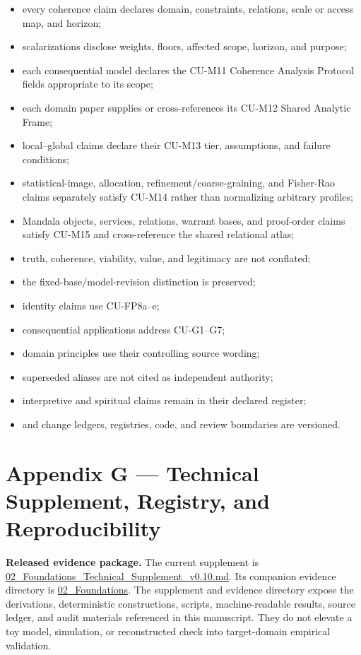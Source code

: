 \documentclass[
  11pt,
]{article}
\providecommand{\tightlist}{%
  \setlength{\itemsep}{0pt}\setlength{\parskip}{0pt}}
\begin{document}
\begin{itemize}
\tightlist
\item
  every coherence claim declares domain, constraints, relations, scale
  or access map, and horizon;
\item
  scalarizations disclose weights, floors, affected scope, horizon, and
  purpose;
\item
  each consequential model declares the CU-M11 Coherence Analysis
  Protocol fields appropriate to its scope;
\item
  each domain paper supplies or cross-references its CU-M12 Shared
  Analytic Frame;
\item
  local--global claims declare their CU-M13 tier, assumptions, and
  failure conditions;
\item
  statistical-image, allocation, refinement/coarse-graining, and
  Fisher-Rao claims separately satisfy CU-M14 rather than normalizing
  arbitrary profiles;
\item
  Mandala objects, services, relations, warrant bases, and proof-order
  claims satisfy CU-M15 and cross-reference the shared relational atlas;
\item
  truth, coherence, viability, value, and legitimacy are not conflated;
\item
  the fixed-base/model-revision distinction is preserved;
\item
  identity claims use CU-FP8a--e;
\item
  consequential applications address CU-G1--G7;
\item
  domain principles use their controlling source wording;
\item
  superseded aliases are not cited as independent authority;
\item
  interpretive and spiritual claims remain in their declared register;
\item
  and change ledgers, registries, code, and review boundaries are
  versioned.
\end{itemize}

\section{Appendix G --- Technical Supplement, Registry, and
Reproducibility}\label{appendix-g-technical-supplement-registry-and-reproducibility}

\textbf{Released evidence package.} The current supplement is
\href{../supplements/02_Foundations_Technical_Supplement_v0.10.md}{02\_Foundations\_Technical\_Supplement\_v0.10.md}.
Its companion evidence directory is
\href{../evidence/02_Foundations/README.md}{02\_Foundations}. The
supplement and evidence directory expose the derivations, deterministic
constructions, scripts, machine-readable results, source ledger, and
audit materials referenced in this manuscript. They do not elevate a toy
model, simulation, or reconstructed check into target-domain empirical
validation.
\end{document}
